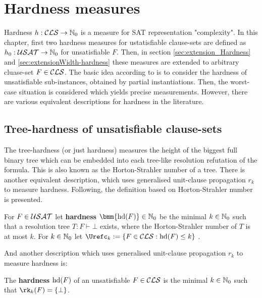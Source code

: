 \documentclass[]{book}
\begin{document}
\chapter{Hardness measures}
\label{cha:Hardness Measures}

Hardness $h :\mathcal{CLS} \rightarrow \mathbb{N}_0$ is a measure for SAT representation "complexity". In this chapter, first two hardness 
measures for ustatisfiable clause-sets are defined as $ h_0 : \mathcal{USAT} \rightarrow \mathbb{N}_0$ for unsatisfiable $F$.
Then, in section \ref{sec:extension_Hardness} and \ref{sec:extensionWidth-hardness} these measures are extended to arbitrary 
cluase-set $F \in \mathcal{CLS}$. The basic idea according to \cite{h20} is to consider the hardness 
of unsatisfiable sub-instances, obtained by partial instantiations. Then, the worst-case situation is considered which yields 
precise measurements. However, there are various equivalent descriptions for hardness in the literature. 

\section{Tree-hardness of unsatisfiable clause-sets}
\label{sec:Hardnessunsat}

The tree-hardness (or just hardness) measures the height of the biggest full binary tree which can be embedded into each tree-like resolution 
refutation of the formula. This is also known as the Horton-Strahler number of a tree. There is another equivalent description, 
which uses generalised unit-clause propagation $r_k$ to measure hardness. Following, the definition based on Horton-Strahler number is presented.

\begin{defi}\label{def:hardness1}
      \cite{h5} For $F \in \mathcal{USAT}$ let \textbf{hardness} $\bmm{\hardness(F)} \in \NNZ$ be the minimal $k \in \mathbb{N}_0$ such that a resolution tree $T : F \vdash \bot$ 
	  exists, where the Horton-Strahler number of $T$ is at most $k$. For $k \in \mathbb{N}_0$ let $\Urefc_k  := \{F \in \Cls : \hardness(F) \le k\}$ .
\end{defi}
And another description which uses generalised unit-clause propagation $r_k$ to measure hardness is:
\begin{defi}\label{def:hardness2}
  \cite{h13} The \textbf{hardness} $\operatorname{hd}(F)$ of an unsatisfiable $F \in \mathcal{CLS}$ is the minimal $k \in \mathbb{N}_0$ such that $\rk_k(F) = \set{\bot}$.
\end{defi}
\end{document}

